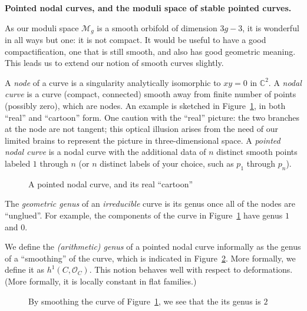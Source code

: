 \documentclass[12pt,letterpaper]{amsart}
\newcommand{\bpoint}[1]{\vspace{3mm}\par \noindent \refstepcounter{subsection}{\bf \thesubsection.} 
  {\bf #1.} }
\newcommand{\C}{\mathbb{C}}
\newcommand{\oh}{{\mathcal{O}}}
\newcommand{\cm}{{\mathcal{M}}}
\newcommand{\lremind}[1]{{\bf[label:  #1]}}
\renewcommand{\lremind}[1]{{}}
\begin{document}
{\bpoint{Pointed nodal curves, and the moduli space of stable
pointed curves}

As our moduli space $\cm_g$ is a smooth orbifold of dimension $3g-3$,
it is wonderful in all ways but one:  it is not compact.  It would 
be useful to have a good compactification, one that is still smooth,
and also has good geometric meaning.
This leads us to extend our notion of smooth curves slightly.

A {\em node} of a curve is a singularity analytically isomorphic to
$xy=0$ in $\C^2$.  A {\em nodal curve} is a curve (compact, connected)
smooth away from finite number of points (possibly zero), which are
nodes.  An example is sketched in Figure~\ref{nodalcurve}, in both
``real'' and ``cartoon'' form.  One caution with the ``real''
picture: the two branches at the node are not tangent; this optical
illusion arises from the need of our limited brains to represent the
picture in three-dimensional space.  A {\em pointed nodal curve}
is a nodal curve with the additional data of $n$ distinct smooth points 
labeled $1$ through $n$ (or $n$ distinct labels of your choice,
such as $p_1$ through $p_n$).

\begin{figure}
\begin{center}

\end{center}
\caption{A pointed nodal curve, and its real ``cartoon'' \lremind{nodalcurve}}
\label{nodalcurve}
\end{figure}

The {\em geometric genus}  of an {\em irreducible} 
curve is its genus once all of the nodes are ``unglued''.  For example,
the components of the curve in Figure~\ref{nodalcurve}
have genus $1$ and $0$.

We define the {\em (arithmetic) genus} of a pointed nodal curve
informally as the genus of a ``smoothing'' of the curve,
which is indicated in Figure~\ref{smoothing}.
More formally, we define it as  $h^1(C, \oh_C)$.  
This notion behaves well with respect to deformations.
(More formally, it is locally constant in flat families.)

\begin{figure}
\begin{center}

\end{center}
  \caption{By smoothing the curve of Figure~\ref{nodalcurve}, we see
    that the its genus is $2$ \lremind{smoothing}}
\label{smoothing}\end{figure}

}
\end{document}
